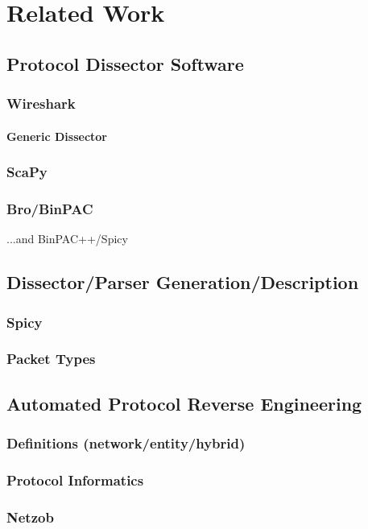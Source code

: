 
\chapter{Related Work}\label{ch:relatedwork}
\glsresetall %

\section{Protocol Dissector Software}
\subsection{Wireshark}
\subsubsection{Generic Dissector}
\subsection{ScaPy}
\subsection{Bro/BinPAC}
...and BinPAC++/Spicy
 \cite{sommer_spicy:_2016}

\section{Dissector/Parser Generation/Description}
\subsection{Spicy}
 \cite{sommer_spicy:_2016}

\subsection{Packet Types}
\cite{mccann_packettypes:_nodate}

\section{Automated Protocol Reverse Engineering}

\subsection{Definitions (network/entity/hybrid)}

\subsection{Protocol Informatics}
\subsection{Netzob}
\cite{bossert_future_2012}

\lipsum[4]


